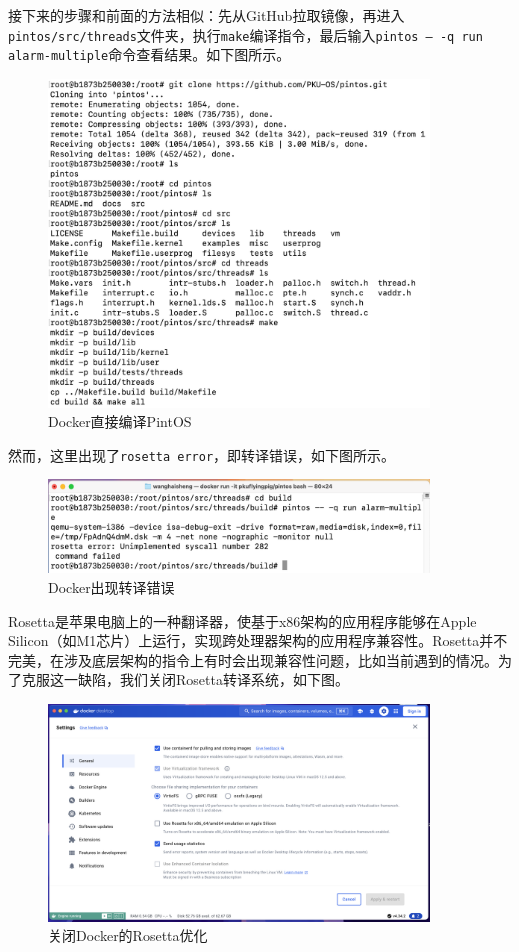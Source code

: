 \documentclass{article}
\begin{document}
接下来的步骤和前面的方法相似：先从GitHub拉取镜像，再进入\texttt{pintos/src/threads}文件夹，执行\texttt{make}编译指令，最后输入\texttt{pintos -- -q run alarm-multiple}命令查看结果。如下图所示。

\begin{figure}[H]
	\centering
	\includegraphics[width=0.9\textwidth]{img/docker_make_try.png}
	\caption{Docker直接编译PintOS}
\end{figure}

然而，这里出现了\texttt{rosetta error}，即转译错误，如下图所示。

\begin{figure}[H]
	\centering
	\includegraphics[width=0.9\textwidth]{img/docker_make_fail.png}
	\caption{Docker出现转译错误}
\end{figure}

Rosetta是苹果电脑上的一种翻译器，使基于x86架构的应用程序能够在Apple Silicon（如M1芯片）上运行，实现跨处理器架构的应用程序兼容性。Rosetta并不完美，在涉及底层架构的指令上有时会出现兼容性问题，比如当前遇到的情况。为了克服这一缺陷，我们关闭Rosetta转译系统，如下图。

\begin{figure}[H]
	\centering
	\includegraphics[width=0.9\textwidth]{img/docker_setup.png}
	\caption{关闭Docker的Rosetta优化}
\end{figure}
\end{document}
